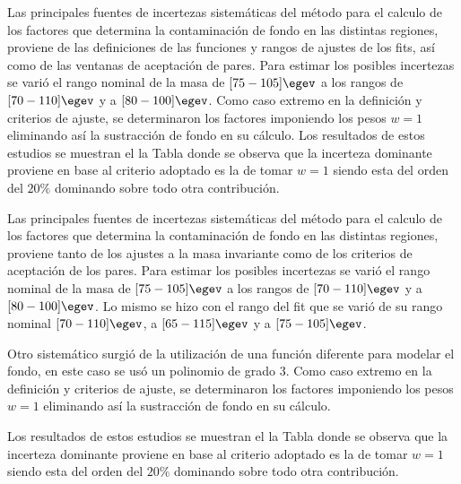 Las principales fuentes de incertezas sistemáticas del método para el calculo de los factores que determina la contaminación de fondo en las distintas regiones, proviene de las definiciones de las funciones y rangos de ajustes de los fits, así como de las ventanas de aceptación de pares.  Para estimar los posibles incertezas se varió el rango nominal de la masa de $[75-105]\egev$ a los rangos de $[70-110]\egev$ y a $[80-100]\egev$. Como caso extremo en la definición y criterios de ajuste, se determinaron los factores imponiendo los pesos $w=1$ eliminando así la sustracción de fondo en su cálculo. Los resultados de estos estudios se muestran el la Tabla \label{ta:fftable} donde se observa que la incerteza dominante proviene en base al criterio adoptado es la de tomar $w=1$ siendo esta del orden del $20 \%$ dominando sobre todo otra contribución.


Las principales fuentes de incertezas sistemáticas del método para el calculo de los factores que determina la contaminación de fondo en las distintas regiones, proviene tanto de los ajustes a la masa invariante como de los criterios de aceptación de los pares.  Para estimar los posibles incertezas se varió el rango nominal de la masa de $[75-105]\egev$ a los rangos de $[70-110]\egev$ y a $[80-100]\egev$. Lo mismo se hizo con el rango del fit que se varió de su rango nominal $[70-110]\egev$, a $[65-115]\egev$ y a $[75-105]\egev$. 

Otro sistemático surgió de la utilización de una función diferente para modelar el fondo, en este caso se usó un polinomio de grado 3. Como caso extremo en la definición y criterios de ajuste, se determinaron los factores imponiendo los pesos $w=1$ eliminando así la sustracción de fondo en su cálculo. 

Los resultados de estos estudios se muestran el la Tabla  donde se observa que la incerteza dominante proviene en base al criterio adoptado es la de tomar $w=1$ siendo esta del orden del $20 \%$ dominando sobre todo otra contribución.




